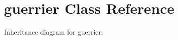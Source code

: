 \hypertarget{classguerrier}{}\section{guerrier Class Reference}
\label{classguerrier}


Inheritance diagram for guerrier\+:
